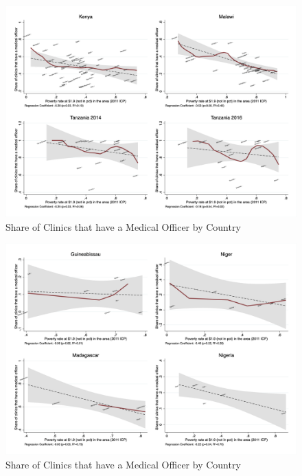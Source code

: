 \documentclass{article}                 %
\begin{document}
			\begin{figure}[H] 
				\centering
				\caption{Share of Clinics that have a Medical Officer by Country} 
				\includegraphics[width=\textwidth]{"../Output/Final/poverty_fl_1_medone"}
			\end{figure}
			
			\begin{figure}[H] 
				\centering
				\caption{Share of Clinics that have a Medical Officer by Country} 
				\includegraphics[width=\textwidth]{"../Output/Final/poverty_fl_2_medone"}
			\end{figure}
			
\end{document}
